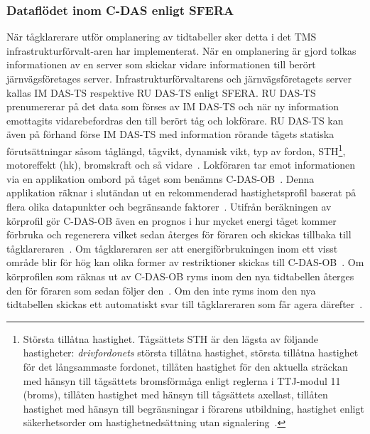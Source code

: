 \subsubsection{Dataflödet inom C-DAS enligt SFERA}
När tågklarerare utför omplanering av tidtabeller sker detta i det TMS infrastrukturförvalt-aren har implementerat.
När en omplanering är gjord tolkas informationen av en server som skickar vidare informationen till berört järnvägsföretages server.
Infrastrukturförvaltarens och järnvägsföretagets server kallas IM DAS-TS respektive RU DAS-TS enligt SFERA\cite{Joborn2023, IRS90940}.
RU DAS-TS prenumererar på det data som förses av IM DAS-TS och när ny information emottagits vidarebefordras den till berört tåg och lokförare.
RU DAS-TS kan även på förhand förse IM DAS-TS med information rörande tågets statiska förutsättningar såsom tåglängd, tågvikt, dynamisk vikt, typ av fordon, STH\footnote{Största tillåtna hastighet. Tågsättets STH är den lägsta av följande hastigheter: \emph{drivfordonets} största tillåtna hastighet, största tillåtna hastighet för det långsammaste fordonet, tillåten hastighet för den aktuella sträckan med hänsyn till tågsättets bromsförmåga enligt reglerna i TTJ-modul 11 (broms), tillåten hastighet med hänsyn till tågsättets axellast, tillåten hastighet med hänsyn till begränsningar i förarens utbildning, hastighet enligt säkerhetsorder om hastighetnedsättning utan signalering~\cite{TTJ2015}.}, motoreffekt (hk), bromskraft och så vidare~\cite{IRS90940}.
Lokföraren tar emot informationen via en applikation ombord på tåget som benämns C-DAS-OB~\cite{Joborn2023, IRS90940}\@.
Denna applikation räknar i slutändan ut en rekommenderad hastighetsprofil baserat på flera olika datapunkter och begränsande faktorer~\cite{Joborn2023, Olsson2023}.
Utifrån beräkningen av körprofil gör C-DAS-OB även en prognos i hur mycket energi tåget kommer förbruka och regenerera vilket sedan återges för föraren och skickas tillbaka till tågklareraren~\cite{Sfera-power-poster-2022}.
Om tågklareraren ser att energiförbrukningen inom ett visst område blir för hög kan olika former av restriktioner skickas till C-DAS-OB~\cite{IRS90940, Joborn2023, Sfera-message-poster-2022}.
Om körprofilen som räknas ut av C-DAS-OB ryms inom den nya tidtabellen återges den för föraren som sedan följer den~\cite{IRS90940, Sfera-usecase-poster-2022}.
Om den inte ryms inom den nya tidtabellen skickas ett automatiskt svar till tågklareraren som får agera därefter~\cite{Sfera-usecase-poster-2022}.
